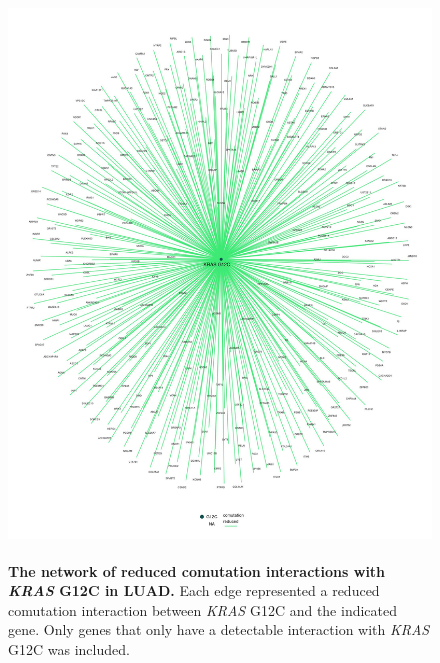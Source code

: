 \documentclass[english, 12pt, letterpaper]{article}
\newcommand{\KRAS}{\emph{KRAS}}
\begin{document}
\begin{figure}[p]
\centering
\includegraphics[height=150mm]{figures/SuppFigure_07.jpeg}
\caption{
    \textbf{The network of reduced comutation interactions with \KRAS{} G12C in LUAD.} Each edge represented a reduced comutation interaction between \KRAS{} G12C and the indicated gene. Only genes that only have a detectable interaction with \KRAS{} G12C was included.
}
\label{sfig:luad_labeled-G12C-reduced-comutation}
\end{figure}
\end{document}
